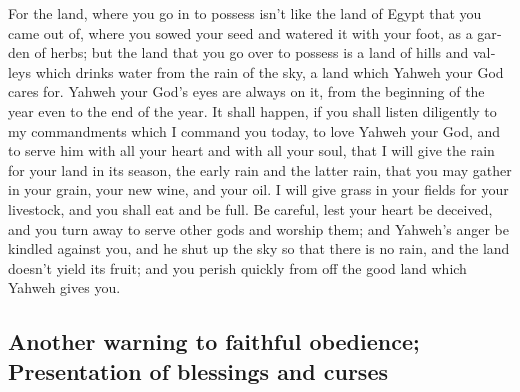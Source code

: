 \begin{paracol}{2}
\begin{otherlanguage}{english}
 For the land, where you go in to possess isn't like the
land of Egypt that you came out of, where you sowed your seed and
watered it with your foot, as a garden of herbs;  but the
land that you go over to possess is a land of hills and valleys which
drinks water from the rain of the sky,  a land which
Yahweh your God cares for. Yahweh your God's eyes are always on it, from
the beginning of the year even to the end of the year. 
It shall happen, if you shall listen diligently to my commandments which
I command you today, to love Yahweh your God, and to serve him with all
your heart and with all your soul,  that I will give the
rain for your land in its season, the early rain and the latter rain,
that you may gather in your grain, your new wine, and your oil.
 I will give grass in your fields for your livestock, and
you shall eat and be full.  Be careful, lest your heart
be deceived, and you turn away to serve other gods and worship them;
 and Yahweh's anger be kindled against you, and he shut
up the sky so that there is no rain, and the land doesn't yield its
fruit; and you perish quickly from off the good land which Yahweh gives
you.

\hypertarget{another-warning-to-faithful-obedience-presentation-of-blessings-and-curses}{%
\subsection{Another warning to faithful obedience; Presentation of
blessings and
curses}\label{another-warning-to-faithful-obedience-presentation-of-blessings-and-curses}}


\end{otherlanguage}
\end{paracol}
